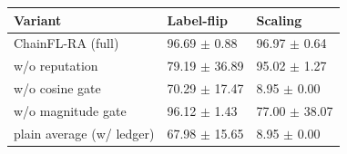 \begin{tabular}{lll}
\toprule
Variant & Label-flip & Scaling \\
\midrule
ChainFL-RA (full) & 96.69 $\pm$ 0.88 & 96.97 $\pm$ 0.64 \\
w/o reputation & 79.19 $\pm$ 36.89 & 95.02 $\pm$ 1.27 \\
w/o cosine gate & 70.29 $\pm$ 17.47 & 8.95 $\pm$ 0.00 \\
w/o magnitude gate & 96.12 $\pm$ 1.43 & 77.00 $\pm$ 38.07 \\
plain average (w/ ledger) & 67.98 $\pm$ 15.65 & 8.95 $\pm$ 0.00 \\
\bottomrule
\end{tabular}

